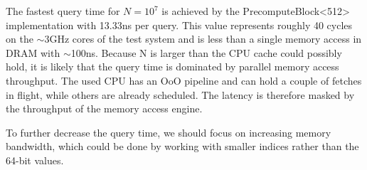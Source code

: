 \documentclass[a4paper,UKenglish,cleveref,thm-restate]{lipics-v2021}
\begin{document}
The fastest query time for $N=10^7$ is achieved by the PrecomputeBlock<512> 
implementation with 13.33ns per query. This value represents roughly 40 cycles
on the $\sim$3GHz cores of the test system and is less than a single memory access 
in DRAM with $\sim$100ns. Because N is larger than the CPU cache could possibly hold,
it is likely that the query time is dominated by parallel memory access throughput.
The used CPU has an OoO pipeline and can hold a couple of fetches in flight, while 
others are already scheduled. The latency is therefore masked by the throughput of the
memory access engine. 

To further decrease the query time, we should focus on increasing memory bandwidth, which 
could be done by working with smaller indices rather than the 64-bit values. 
\end{document}
